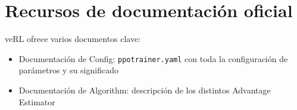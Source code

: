 \section{Recursos de documentación oficial}
veRL ofrece varios documentos clave:
\begin{itemize}
  \item Documentación de Config: \texttt{ppotrainer.yaml} con toda la configuración de parámetros y su significado
  \item Documentación de Algorithm: descripción de los distintos Advantage Estimator
\end{itemize}


